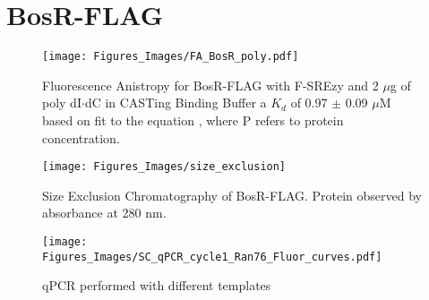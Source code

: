 \documentclass[12pt,twoside]{reedthesis}
\begin{document}
      \section{BosR-FLAG}
      
      \begin{figure}[h]
      	\centering
      	\texttt{[image: Figures\_Images/FA\_BosR\_poly.pdf]}
      	\caption[Determining DNA Activity of BosR-FLAG by Fluorescence Anistropy]{Fluorescence Anistropy for BosR-FLAG with F-SREzy and 2 $\mu$g of poly dI$\cdot$dC in CASTing Binding Buffer  a $K_{d}$ of 0.97 $\pm$ 0.09 $\mu$M based on fit to the equation \FAstdfit , where P refers to protein concentration.}
      	\label{BosRFLAGFApoly}
      \end{figure}
      
            \begin{figure}[h]
            	\centering
            	\texttt{[image: Figures\_Images/size\_exclusion]}
            	\caption[Size Exclusion Chromatography of BosR-FLAG]{Size Exclusion Chromatography of BosR-FLAG. Protein observed by absorbance at 280 nm.}
            	\label{BosRFLAGSizeEx}
            \end{figure}
      
      
    \begin{figure}[h!tbp]
    	\centering
    	\texttt{[image: Figures\_Images/SC\_qPCR\_cycle1\_Ran76\_Fluor\_curves.pdf]}
    	\caption[qPCR of 1st Cycle of CASTing Fluorescence Curves]{qPCR performed with different templates}
    	\label{qPCRcycle1fluorcurves}
    \end{figure}
    
\end{document}
